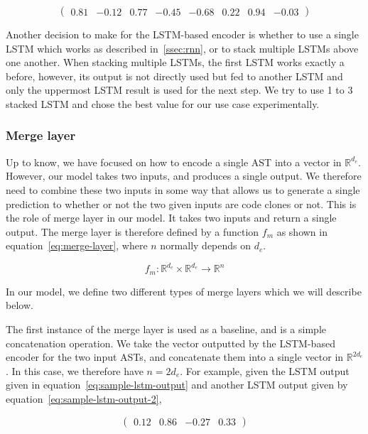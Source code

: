 \begin{equation}
  \label{eq:sample-bilstm-output}
  \begin{pmatrix}
    0.81 & -0.12 & 0.77 & -0.45 & -0.68 & 0.22 & 0.94 & -0.03
  \end{pmatrix}
\end{equation}

Another decision to make for the LSTM-based encoder is whether to use a single
LSTM which works as described in~\ref{ssec:rnn}, or to stack multiple LSTMs
above one another. When stacking multiple LSTMs, the first LSTM works exactly a
before, however, its output is not directly used but fed to another LSTM and
only the uppermost LSTM result is used for the next step. We try to use 1 to 3
stacked LSTM and chose the best value for our use case experimentally.
%
\subsubsection{Merge layer}
Up to know, we have focused on how to encode a single AST into a vector in
$\mathbb{R}^{d_e}$. However, our model takes two inputs, and produces a single
output. We therefore need to combine these two inputs in some way that allows us
to generate a single prediction to whether or not the two given inputs are
code clones or not. This is the role of merge layer in our model. It takes two
inputs and return a single output. The merge layer is therefore defined by a
function $f_m$ as shown in equation~\ref{eq:merge-layer}, where $n$ normally
depends on $d_e$.

\begin{equation}
  \label{eq:merge-layer}
  f_m : \mathbb{R}^{d_e} \times \mathbb{R}^{d_e} \rightarrow \mathbb{R}^{n}
\end{equation}

In our model, we define two different types of merge layers which we will
describe below.

The first instance of the merge layer is used as a baseline, and is a simple
concatenation operation. We take the vector outputted by the LSTM-based encoder
for the two input ASTs, and concatenate them into a single vector in
$\mathbb{R}^{2d_e}$. In this case, we therefore have $n = 2d_e$.
For example, given the LSTM output given in equation~\ref{eq:sample-lstm-output}
and another LSTM output given by equation~\ref{eq:sample-lstm-output-2},

\begin{equation}
  \label{eq:sample-lstm-output-2}
  \begin{pmatrix}0.12 & 0.86 & -0.27 & 0.33\end{pmatrix}
\end{equation}

